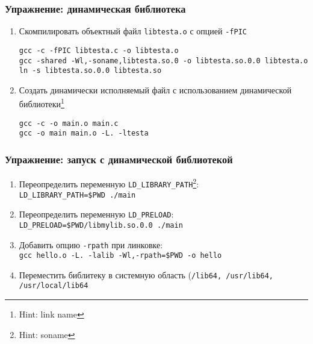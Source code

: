 \begin{frame}[fragile]
	\frametitle{Упражнение: динамическая библиотека}

	\begin{enumerate}
		\item Скомпилировать объектный файл {\tt libtesta.o} с опцией {\tt -fPIC}
		
\begin{verbatim}
gcc -c -fPIC libtesta.c -o libtesta.o
gcc -shared -Wl,-soname,libtesta.so.0 -o libtesta.so.0.0 libtesta.o
ln -s libtesta.so.0.0 libtesta.so
\end{verbatim}
		\item Создать динамически исполняемый файл с использованием динамической библиотеки\footnote{Hint: link name}
\begin{verbatim}
gcc -c -o main.o main.c
gcc -o main main.o -L. -ltesta
\end{verbatim}

	\end{enumerate}
\end{frame}


\begin{frame}[fragile]
	\frametitle{Упражнение: запуск с динамической библиотекой}

	\begin{enumerate}
		\item Переопределить переменную {\tt LD\_LIBRARY\_PATH}\footnote{Hint: soname}:\\
			{\tt LD\_LIBRARY\_PATH=\$PWD ./main}
		\item Переопределить переменную {\tt LD\_PRELOAD}:\\
			{\tt LD\_PRELOAD=\$PWD/libmylib.so.0.0 ./main}
		\item Добавить опцию {\tt -rpath} при линковке:\\
			{\tt gcc hello.o -L. -lalib -Wl,-rpath=\$PWD -o hello}
		\item Переместить библитеку в системную область ({\tt /lib64, /usr/lib64, /usr/local/lib64}
	\end{enumerate}
\end{frame}




